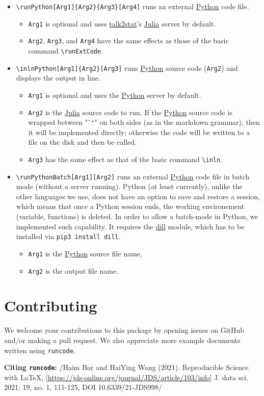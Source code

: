 \documentclass{ltxdoc}
\begin{document}
\begin{itemize}
\item \texttt{\textbackslash{}runPython[Arg1]\{Arg2\}\{Arg3\}[Arg4]} runs an external
\href{https://www.python.org/}{Python} code file.
\begin{itemize}
\item \texttt{Arg1} is optional and uses
\href{https://pypi.org/project/talk2stat/}{talk2stat}'s
\href{https://julialang.org/}{Julia} server by default.
\item \texttt{Arg2}, \texttt{Arg3}, and \texttt{Arg4} have the same effects as those of the
basic command \texttt{\textbackslash{}runExtCode}.
\end{itemize}
\item \texttt{\textbackslash{}inlnPython[Arg1]\{Arg2\}[Arg3]} runs
\href{https://www.python.org/}{Python} source code (\texttt{Arg2}) and displays
the output in line.
\begin{itemize}
\item \texttt{Arg1} is optional and uses the \href{https://www.python.org/}{Python}
server by default.
\item \texttt{Arg2} is the \href{https://julialang.org/}{Julia} source code to run.
If the \href{https://www.python.org/}{Python} source code is wrapped
between "```" on both sides (as in the markdown grammar), then it
will be implemented directly; otherwise the code will be written to
a file on the disk and then be called.
\item \texttt{Arg3} has the same effect as that of the basic command \texttt{\textbackslash{}inln}.
\end{itemize}
\item \texttt{\textbackslash{}runPythonBatch[Arg1][Arg2]} runs an external
\href{https://www.python.org/}{Python} code file in batch mode (without a
server running). Python (at least currently), unlike the other
languages we use, does not have an option to save and restore a
session, which means that once a Python session ends, the working
environement (variable, functions) is deleted. In order to allow a
batch-mode in Python, we implemented such capability. It requires the
\href{https://pypi.org/project/dill/}{dill} module, which has to be
installed via \texttt{pip3 install dill}.
\begin{itemize}
\item \texttt{Arg1} is the \href{https://www.python.org/}{Python} source file name,
\item \texttt{Arg2} is the output file name.
\end{itemize}
\end{itemize}


\section{Contributing}
\label{contributing}
We welcome your contributions to this package by opening issues on
GitHub and/or making a pull request. We also appreciate more example
documents written using \texttt{runcode}.


\textbf{Citing \texttt{runcode}:} /Haim Bar and HaiYing Wang (2021). Reproducible
Science with \LaTeX{},
[\url{https://jds-online.org/journal/JDS/article/103/info}] J. data sci. 2021;
19, no. 1, 111-125, DOI 10.6339/21-JDS998/
\end{document}
